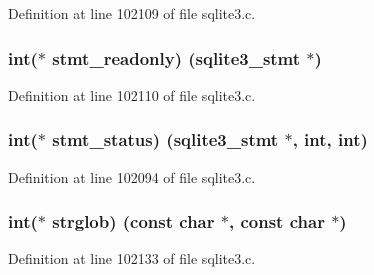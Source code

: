 Definition at line 102109 of file sqlite3.\+c.

\hypertarget{structsqlite3__api__routines_add589eb134334b8249eff03f7556c90d}{}
\subsubsection[{stmt\+\_\+readonly}]{\setlength{\rightskip}{0pt plus 5cm}int($\ast$ stmt\+\_\+readonly) ({\bf sqlite3\+\_\+stmt} $\ast$)}\label{structsqlite3__api__routines_add589eb134334b8249eff03f7556c90d}


Definition at line 102110 of file sqlite3.\+c.

\hypertarget{structsqlite3__api__routines_a3447f99a2af09362727c363b6a41f79b}{}
\subsubsection[{stmt\+\_\+status}]{\setlength{\rightskip}{0pt plus 5cm}int($\ast$ stmt\+\_\+status) ({\bf sqlite3\+\_\+stmt} $\ast$, int, int)}\label{structsqlite3__api__routines_a3447f99a2af09362727c363b6a41f79b}


Definition at line 102094 of file sqlite3.\+c.

\hypertarget{structsqlite3__api__routines_ab57cdd985ed3e28d8fc6a74011b031cc}{}
\subsubsection[{strglob}]{\setlength{\rightskip}{0pt plus 5cm}int($\ast$ strglob) (const char $\ast$, const char $\ast$)}\label{structsqlite3__api__routines_ab57cdd985ed3e28d8fc6a74011b031cc}


Definition at line 102133 of file sqlite3.\+c.

\hypertarget{structsqlite3__api__routines_a4a4d0359c8a7c68edb15957cf45c0082}{}
